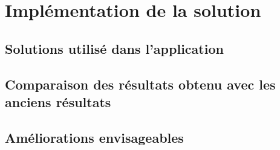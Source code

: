 \section{Implémentation de la solution}

\subsection{Solutions utilisé dans l'application}

\subsection{Comparaison des résultats obtenu avec les anciens résultats}

\subsection{Améliorations envisageables}